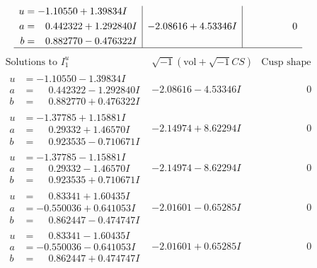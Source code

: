 \documentclass[1p]{elsarticle_modified}
\theoremstyle{definition}
\newcommand{\I}{\sqrt{-1}}
\begin{document}
$$\begin{array}{c|c|c}
\begin{aligned}
u &= -1.10550 + 1.39834 I \\
a &= \phantom{-}0.442322 + 1.292840 I \\
b &= \phantom{-}0.882770 - 0.476322 I\end{aligned}
 & -2.08616 + 4.53346 I & \phantom{-0.000000 } 0\\
 \hline 
 \end{array}$$\newpage$$\begin{array}{c|c|c}  
\text{Solutions to }I^u_{1}& \I (\text{vol} + \sqrt{-1}CS) & \text{Cusp shape}\\
 \hline 
\begin{aligned}
u &= -1.10550 - 1.39834 I \\
a &= \phantom{-}0.442322 - 1.292840 I \\
b &= \phantom{-}0.882770 + 0.476322 I\end{aligned}
 & -2.08616 - 4.53346 I & \phantom{-0.000000 } 0 \\ \hline\begin{aligned}
u &= -1.37785 + 1.15881 I \\
a &= \phantom{-}0.29332 + 1.46570 I \\
b &= \phantom{-}0.923535 - 0.710671 I\end{aligned}
 & -2.14974 + 8.62294 I & \phantom{-0.000000 } 0 \\ \hline\begin{aligned}
u &= -1.37785 - 1.15881 I \\
a &= \phantom{-}0.29332 - 1.46570 I \\
b &= \phantom{-}0.923535 + 0.710671 I\end{aligned}
 & -2.14974 - 8.62294 I & \phantom{-0.000000 } 0 \\ \hline\begin{aligned}
u &= \phantom{-}0.83341 + 1.60435 I \\
a &= -0.550036 + 0.641053 I \\
b &= \phantom{-}0.862447 - 0.474747 I\end{aligned}
 & -2.01601 - 0.65285 I & \phantom{-0.000000 } 0 \\ \hline\begin{aligned}
u &= \phantom{-}0.83341 - 1.60435 I \\
a &= -0.550036 - 0.641053 I \\
b &= \phantom{-}0.862447 + 0.474747 I\end{aligned}
 & -2.01601 + 0.65285 I & \phantom{-0.000000 } 0 \\ \hline\begin{aligned}

\end{aligned}
\end{array}$$
\end{document}
